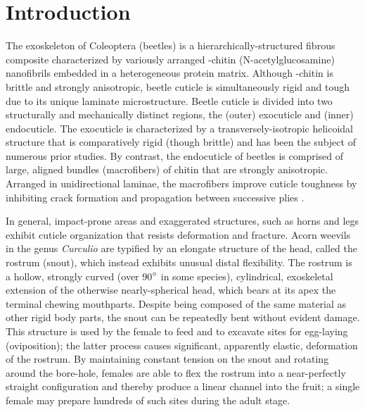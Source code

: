 \documentclass[twocolumn, linenumbers, superscriptaddress]{revtex4-1}
\begin{document}
\section*{Introduction} 
	{The exoskeleton of Coleoptera (beetles) is a hierarchically-structured fibrous composite characterized by variously arranged \textalpha-chitin (N-acetylglucosamine) nanofibrils embedded in a heterogeneous protein matrix.
	Although \textalpha-chitin is brittle and strongly anisotropic, beetle cuticle is simultaneously rigid and tough due to its unique laminate microstructure.
	Beetle cuticle is divided into two structurally and mechanically distinct regions, the (outer) exocuticle and (inner) endocuticle.
	The exocuticle is characterized by a transversely-isotropic helicoidal structure that is comparatively rigid (though brittle) and has been the subject of numerous prior studies.
	By contrast, the endocuticle of beetles is comprised of large, aligned bundles (macrofibers) of chitin that are strongly anisotropic.
	Arranged in unidirectional laminae, the macrofibers improve cuticle toughness by inhibiting crack formation and propagation between successive plies \cite{Kamp2010,Kamp2015,Hepburn1973}.
	
	In general, impact-prone areas and exaggerated structures, such as horns and legs exhibit cuticle organization that resists deformation and fracture.
	Acorn weevils in the genus \textit{Curculio} are typified by an elongate structure of the head, called the rostrum (snout), which instead exhibits unusual distal flexibility.
	The rostrum is a hollow, strongly curved (over 90$\degree$ in some species), cylindrical, exoskeletal extension of the otherwise nearly-spherical head, which bears at its apex the terminal chewing mouthparts.
	Despite being composed of the same material as other rigid body parts, the snout can be repeatedly bent without evident damage.
	This structure is used by the female to feed and to excavate sites for egg-laying (oviposition); the latter process causes significant, apparently elastic, deformation of the rostrum.
	By maintaining constant tension on the snout and rotating around the bore-hole, females are able to flex the rostrum into a near-perfectly straight configuration and thereby produce a linear channel into the fruit; a single female may prepare hundreds of such sites during the adult stage.
	
}
\end{document}
